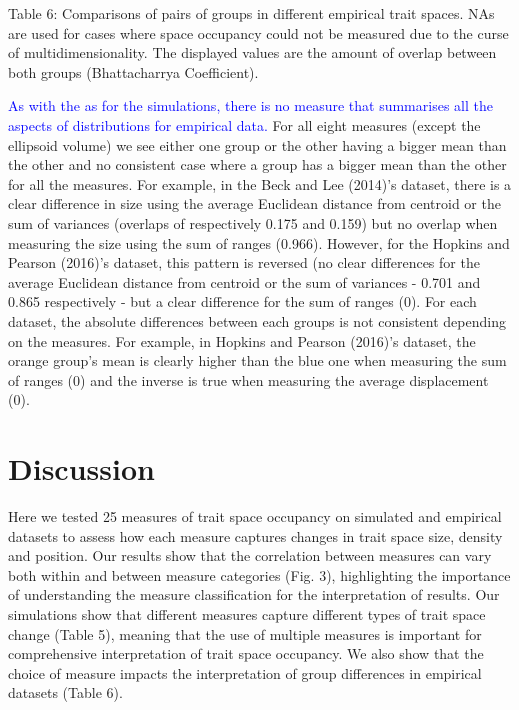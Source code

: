 \documentclass[]{article}
\begin{document}
Table 6: Comparisons of pairs of groups in different empirical trait
spaces. NAs are used for cases where space occupancy could not be
measured due to the curse of multidimensionality. The displayed values
are the amount of overlap between both groups (Bhattacharrya
Coefficient).

\renewcommand\baselinestretch{1.6}\selectfont


\textcolor{blue}{As with the as for the simulations,
there is no measure that summarises all the aspects of distributions for
empirical data.} For all eight measures (except the ellipsoid volume)
we see either one group or the other having a bigger mean than the other
and no consistent case where a group has a bigger mean than the other
for all the measures. For example, in the Beck and Lee (2014)'s dataset,
there is a clear difference in size using the average Euclidean distance
from centroid or the sum of variances (overlaps of respectively 0.175
and 0.159) but no overlap when measuring the size using the sum of
ranges (0.966). However, for the Hopkins and Pearson (2016)'s dataset,
this pattern is reversed (no clear differences for the average Euclidean
distance from centroid or the sum of variances - 0.701 and 0.865
respectively - but a clear difference for the sum of ranges (0). For
each dataset, the absolute differences between each groups is not
consistent depending on the measures. For example, in Hopkins and
Pearson (2016)'s dataset, the orange group's mean is clearly higher than
the blue one when measuring the sum of ranges (0) and the inverse is
true when measuring the average displacement (0).

\section{Discussion}\label{discussion}

Here we tested 25 measures of trait space occupancy on simulated and
empirical datasets to assess how each measure captures changes in trait
space size, density and position. Our results show that the correlation
between measures can vary both within and between measure categories
(Fig. 3), highlighting the importance of understanding the measure
classification for the interpretation of results. Our simulations show
that different measures capture different types of trait space change
(Table 5), meaning that the use of multiple measures is important for
comprehensive interpretation of trait space occupancy. We also show that
the choice of measure impacts the interpretation of group differences in
empirical datasets (Table 6).
\end{document}
